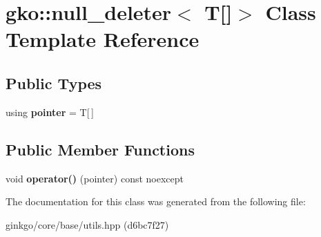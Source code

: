 \hypertarget{classgko_1_1null__deleter_3_01T[]_4}{}\section{gko\+:\+:null\+\_\+deleter$<$ T\mbox{[}\mbox{]}$>$ Class Template Reference}
\label{classgko_1_1null__deleter_3_01T[]_4}
\subsection*{Public Types}
\begin{DoxyCompactItemize}
\item 
\mbox{\label{classgko_1_1null__deleter_3_01T[]_4_a327915073992d00be1ff71150c2792b3}} 
using {\bfseries pointer} = T\mbox{[}$\,$\mbox{]}
\end{DoxyCompactItemize}
\subsection*{Public Member Functions}
\begin{DoxyCompactItemize}
\item 
\mbox{\label{classgko_1_1null__deleter_3_01T[]_4_abce6b34c72d1cb5984b1809787f73012}} 
void {\bfseries operator()} (pointer) const noexcept
\end{DoxyCompactItemize}


The documentation for this class was generated from the following file\+:\begin{DoxyCompactItemize}
\item 
ginkgo/core/base/utils.\+hpp (d6bc7f27)\end{DoxyCompactItemize}
